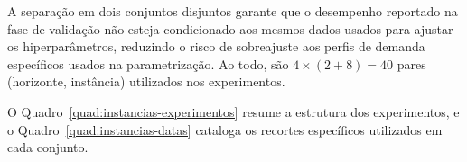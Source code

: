 A separação em dois conjuntos disjuntos garante que o desempenho reportado na fase de validação não esteja condicionado aos mesmos dados usados para ajustar os hiperparâmetros, reduzindo o risco de sobreajuste aos perfis de demanda específicos usados na parametrização. Ao todo, são $4 \times (2 + 8) = 40$ pares (horizonte, instância) utilizados nos experimentos.

O Quadro~\ref{quad:instancias-experimentos} resume a estrutura dos experimentos, e o Quadro~\ref{quad:instancias-datas} cataloga os recortes específicos utilizados em cada conjunto.

\begin{quadro}[h]
	\centering
	\caption{Estrutura dos experimentos por horizonte de planejamento.}

	\label{quad:instancias-experimentos}
	\fautor
\end{quadro}

